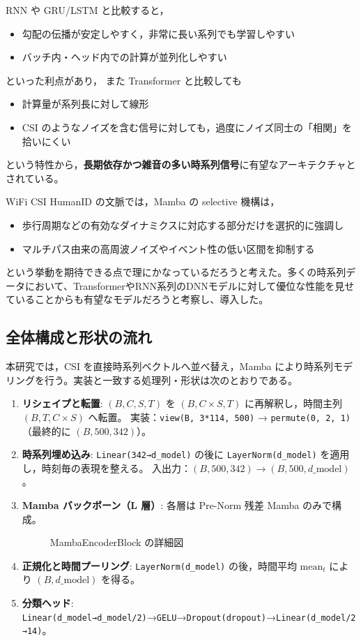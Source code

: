 \documentclass[11pt]{ltjsarticle}
\begin{document}
RNN や GRU/LSTM と比較すると，
\begin{itemize}
  \item 勾配の伝播が安定しやすく，非常に長い系列でも学習しやすい
  \item バッチ内・ヘッド内での計算が並列化しやすい
\end{itemize}
といった利点があり，
また Transformer と比較しても
\begin{itemize}
  \item 計算量が系列長に対して線形
  \item CSI のようなノイズを含む信号に対しても，過度にノイズ同士の「相関」を拾いにくい
\end{itemize}
という特性から，\textbf{長期依存かつ雑音の多い時系列信号}に有望なアーキテクチャとされている。

WiFi CSI HumanID の文脈では，Mamba の selective 機構は，
\begin{itemize}
  \item 歩行周期などの有効なダイナミクスに対応する部分だけを選択的に強調し
  \item マルチパス由来の高周波ノイズやイベント性の低い区間を抑制する
\end{itemize}
という挙動を期待できる点で理にかなっているだろうと考えた。多くの時系列データにおいて、TransformerやRNN系列のDNNモデルに対して優位な性能を見せていることからも有望なモデルだろうと考察し、導入した。

\subsection*{全体構成と形状の流れ}
本研究では，CSI を直接時系列ベクトルへ並べ替え，Mamba により時系列モデリングを行う。実装と一致する処理列・形状は次のとおりである。
\begin{enumerate}
  \item \textbf{リシェイプと転置}: \((B, C, S, T)\) を \((B, C\!\times\!S, T)\) に再解釈し，時間主列 \((B, T, C\!\times\!S)\) へ転置。\newline
        実装：\texttt{view(B, 3*114, 500)} → \texttt{permute(0, 2, 1)}（最終的に \((B,500,342)\)）。
  \item \textbf{時系列埋め込み}: \texttt{Linear(342→d\_model)} の後に \texttt{LayerNorm(d\_model)} を適用し，時刻毎の表現を整える。\newline
        入出力：\((B, 500, 342) \to (B, 500, d\_\mathrm{model})\)。
  \item \textbf{Mamba バックボーン（L 層）}: 各層は Pre-Norm 残差 Mamba のみで構成。
        \begin{figure}[H]
          \centering
          
          \caption{MambaEncoderBlock の詳細図}
          \label{fig:mamba_block}
        \end{figure}
  \item \textbf{正規化と時間プーリング}: \texttt{LayerNorm(d\_model)} の後，時間平均 \(\mathrm{mean}_t\) により \((B, d\_\mathrm{model})\) を得る。
  \item \textbf{分類ヘッド}: \texttt{Linear(d\_model→d\_model/2)}→\texttt{GELU}→\texttt{Dropout(dropout)}→\texttt{Linear(d\_model/2→14)}。
\end{enumerate}
\end{document}

